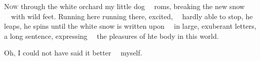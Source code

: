 \newpage %


\begin{poem}
\begin{stanza}
\textsc{Now} through the white orchard my little dog\verseline
~~roms, breaking the new snow\verseline
~~with wild feet.\verseline
Running here running there, excited,\verseline
~~hardly able to stop, he leaps, he spins\verseline
until the white snow is written upon\verseline
~~in large, exuberant letters,\verseline
a long sentence, expressing\verseline
~~the pleasures of hte body in this world.
\end{stanza}

\begin{stanza}
Oh, I could not have said it better\verseline
~~myself.
\end{stanza}
\end{poem}

\newpage %


